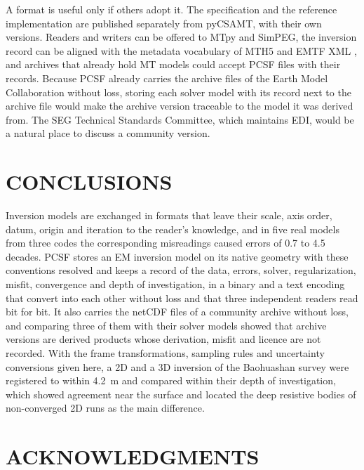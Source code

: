 \documentclass[manuscript]{geophysics}
\newif\ifreview
\begin{document}
A format is useful only if others adopt it. The specification and
the reference implementation are published separately from pyCSAMT,
with their own versions. Readers and
writers can be offered to MTpy and SimPEG, the inversion record can be
aligned with the metadata vocabulary of MTH5 \citep{Peacock2022MTH5}
and EMTF XML \citep{Kelbert2020}, and archives that already hold MT
models could accept PCSF files with their records. Because PCSF
already carries the archive files of the Earth Model Collaboration
without loss, storing each solver model with its record next to the
archive file would make the archive version traceable to the model it
was derived from. The SEG Technical Standards Committee, which
maintains EDI, would be a natural place to discuss a community
version.

\section{CONCLUSIONS}

Inversion models are exchanged in formats that leave their scale, axis
order, datum, origin and iteration to the reader's knowledge, and in
five real models from three codes the corresponding misreadings caused
errors of 0.7 to 4.5 decades. PCSF stores an EM inversion model on its
native geometry with these conventions resolved and keeps a
record of the data, errors, solver, regularization, misfit,
convergence and depth of investigation, in a binary and a text
encoding that convert into each other without loss and that three
independent readers read bit for bit. It also carries the netCDF files
of a community archive without loss, and comparing three of them with
their solver models showed that archive versions are derived products
whose derivation, misfit and licence are not recorded. With the frame
transformations,
sampling rules and uncertainty conversions given here, a 2D and a 3D
inversion of the Baohuashan survey were registered to within 4.2~m and
compared within their depth of investigation, which showed agreement
near the surface and located the deep resistive bodies of
non-converged 2D runs as the main difference.

\ifreview\else
\section{ACKNOWLEDGMENTS}
\end{document}
